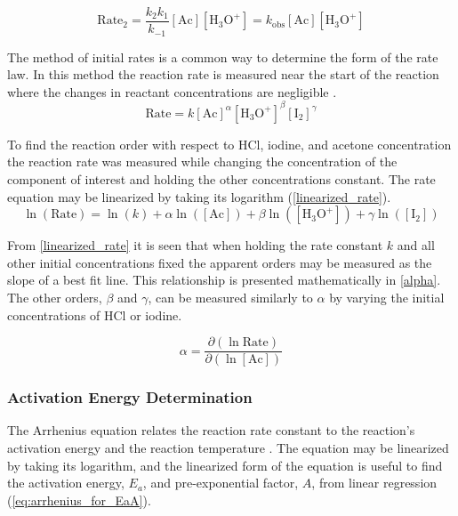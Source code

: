 \documentclass{article}
\begin{document}
\begin{equation}
    \mathrm{Rate}_2 = \frac{k_2 k_1}{k_{-1}} [\mathrm{Ac}][\mathrm{H_3O^+}] = k_\mathrm{obs} [\mathrm{Ac}][\mathrm{H_3O^+}] \label{theoRate}
\end{equation}

The method of initial rates is a common way to determine the form of the rate law. In this method the reaction rate is measured near the start of the reaction where the changes in reactant concentrations are negligible \autocite{initialrates}. 
\begin{equation}
    \mathrm{Rate} = k [\mathrm{Ac}]^{\alpha} [\mathrm{H_3O^+}]^{\beta} [\mathrm{I_2}]^{\gamma} \label{powerlaw}
\end{equation}

To find the reaction order with respect to HCl, iodine, and acetone concentration the reaction rate was measured while changing the concentration of the component of interest and holding the other concentrations constant. The rate equation may be linearized by taking its logarithm (\cref{linearized_rate}).
\begin{equation}
\ln(\mathrm{Rate}) = \ln (k) + \alpha \ln ( [\mathrm{Ac}] ) + \beta \ln ([\mathrm{H_3O^+}]) + \gamma \ln ([\mathrm{I_2}])  \label{linearized_rate}
\end{equation}


From \cref{linearized_rate} it is seen that when holding the rate constant $k$ and all other initial concentrations fixed the apparent orders may be measured as the slope of a best fit line. This relationship is presented mathematically in \cref{alpha}. The other orders, $\beta$ and $\gamma$, can be measured similarly to $\alpha$ by varying the initial concentrations of HCl or iodine.

\begin{equation}
    \alpha = \frac{\partial (\ln \mathrm{Rate})}{\partial (\ln [\mathrm{Ac}])} \label{alpha}
\end{equation}


\subsubsection{Activation Energy Determination}
The Arrhenius equation relates the reaction rate constant to the reaction's activation energy and the reaction temperature \autocite{arrhenius}. The equation may be linearized by taking its logarithm, and the linearized form of the equation is useful to find the activation energy, $E_a$, and pre-exponential factor, $A$, from linear regression (\cref{eq:arrhenius_for_EaA}).
\end{document}

